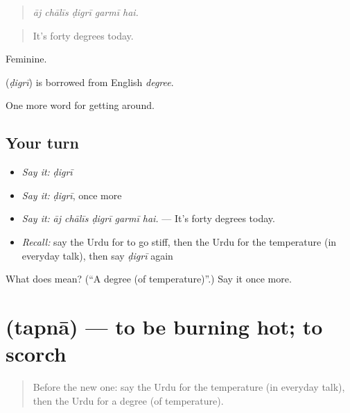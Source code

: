 \begin{quote}
    
\end{quote}

\begin{quote}
\emph{āj chālīs ḍigrī garmī hai.}
\end{quote}

\begin{quote}
It's forty degrees today.
\end{quote}

Feminine.

\begin{cousinweb}
\textbf{} (\emph{ḍigrī}) is borrowed from English \emph{degree}.
\end{cousinweb}

\begin{grammarlens}[title={What you've built}]
One more word for getting around.
\end{grammarlens}

\subsection*{Your turn}
\begin{itemize}
\raggedright
  \item \emph{Say it:} \emph{ḍigrī}
  \item \emph{Say it:} \emph{ḍigrī}, once more
  \item \emph{Say it:} \emph{āj chālīs ḍigrī garmī hai.} — It's forty degrees today.
  \item \emph{Recall:} say the Urdu for to go stiff, then the Urdu for the temperature (in everyday talk), then say \emph{ḍigrī} again
\end{itemize}

\begin{tcolorbox}[breakable,colback=teal!4,colframe=teal!35!black,title={Before you move on}]
What does  mean? (\textquotedblleft{}A degree (of temperature)\textquotedblright{}.) Say it once more.
\end{tcolorbox}
\section[\texorpdfstring{\ur{تپنا} (tapnā)}{تپنا (tapnā)}]{ (tapnā) — to be burning hot; to scorch}

\label{lesson:UR-C430-tapna}



\begin{quote}
Before the new one: say the Urdu for the temperature (in everyday talk), then the Urdu for a degree (of temperature).
\end{quote}

